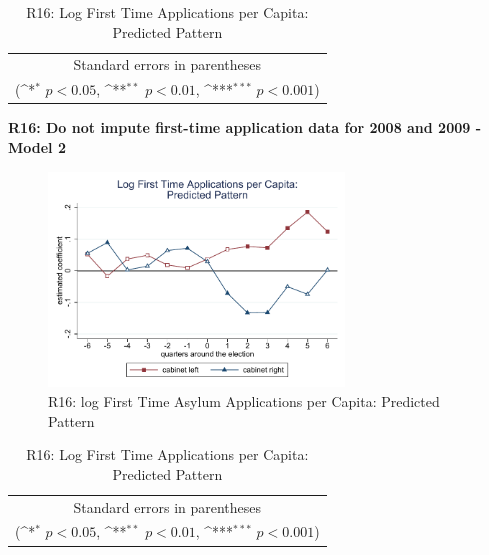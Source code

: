 \documentclass[10pt,a4paper]{scrartcl}
\begin{document}
\begin{table}[!ht]\centering
	\renewcommand{\arraystretch}{1.25}
	\def\sym#1{\ifmmode^{#1}\else\(^{#1}\)\fi}
	\caption{R16: Log First Time Applications per Capita: Predicted Pattern}
	\begin{tabular}{l*{2}{c}}
		\hline\hline
		
		\hline\hline
		\multicolumn{3}{c}{\footnotesize Standard errors in parentheses} \\
		\multicolumn{3}{c}{\footnotesize (\sym{*} \(p<0.05\), \sym{**} \(p<0.01\), \sym{***} \(p<0.001\))}\\
	\end{tabular}
\end{table}

\clearpage
\textbf{R16: Do not impute first-time application data for 2008 and 2009 - Model 2}
\begin{figure}[!ht]
	\centering
	\includegraphics[width=0.7\textwidth]{figures_edited/app_graph2_R16.pdf}
	\caption{R16: log First Time Asylum Applications per Capita: Predicted Pattern}
\end{figure}

\begin{table}[!ht]\centering
	\footnotesize
	\renewcommand{\arraystretch}{1.2}
	\def\sym#1{\ifmmode^{#1}\else\(^{#1}\)\fi}
	\caption{R16: Log First Time Applications per Capita: Predicted Pattern}
	\begin{tabular}{l*{2}{c}}
		\hline\hline
		
		\hline\hline
		\multicolumn{3}{c}{\footnotesize Standard errors in parentheses} \\
		\multicolumn{3}{c}{\footnotesize (\sym{*} \(p<0.05\), \sym{**} \(p<0.01\), \sym{***} \(p<0.001\))} \\
	\end{tabular}
\end{table}
\end{document}

